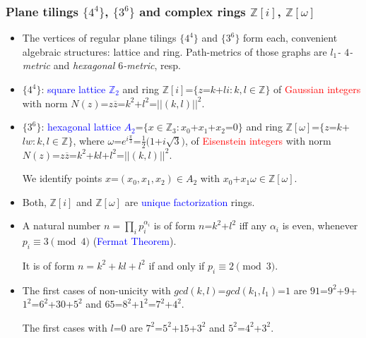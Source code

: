 \documentclass{beamer}
\newcommand{\ZZ}{\ensuremath{\mathbb{Z}}}
\begin{document}
\begin{frame}\frametitle{Plane tilings $\{4^4\}$, $\{3^6\}$ and 
 complex rings 
$\mathbb{Z}[i]$,
$\mathbb{Z}[\omega]$}
\vspace{-3mm}
\begin{itemize}
\item
The vertices of regular plane tilings $\{4^4\}$  and
$\{3^6\}$ form each,  convenient  algebraic structures: lattice and  ring.
Path-metrics of those graphs are {\em $l_1$- $4$-metric} and {\em 
hexagonal  
$6$-metric}, resp.
\item $\{4^4\}$:
\textcolor{blue}{square lattice $\mathbb{Z}_2$} and  ring
$\mathbb{Z}[i]$=$\{z$=$k$+$li: k,l \in \mathbb{Z}\}$ of
\textcolor{red}{Gaussian integers} with norm
$N(z)$=$z\overline{z}$=$k^2$+$l^2$=$||(k,l)||^2$.
\item $\{3^6\}$:  \textcolor{blue}{hexagonal lattice $A_2$}=$\{x\in 
\mathbb{Z}_3:
x_0$+$x_1$+$x_2$=$0\}$  and  ring
$\mathbb{Z}[\omega]$=$\{z$=$k$+$lw: k,l \in \mathbb{Z}\}$, where
$\omega$=$e^{i\frac{\pi}{3}}$=$\frac{1}{2}(1$+$i\sqrt{3})$,  of
\textcolor{red}{Eisenstein integers}
with norm   
$N(z)$=$z\overline{z}$=$k^2$+$kl$+$l^2$=$||(k,l)||^2$.

We identify  points $x$=$(x_0,x_1,x_2)\in A_2$ with 
$x_0$+$x_1\omega\in \mathbb{Z}[\omega]$.

\item Both,  $\ZZ[i]$
 and  $\ZZ[\omega]$ are \textcolor{blue}{unique factorization}
rings. 


\item A natural number  $n= \prod_{i}p_i^{\alpha_i}$ is of form
$n$=$k^2$+$l^2$ iff any $\alpha_i$ is even,
whenever $p_i \equiv 3\pmod4$ (\textcolor{blue}{Fermat Theorem}).

It is of form 
$n=k^2+kl+l^2$ if and only if 
$p_i\equiv 2\pmod 3$.

\item The first cases of non-unicity with 
$gcd(k,l)$=$gcd(k_1,l_1)$=$1$ are $91$=$9^2$+$9$+$1^2$=$6^2$+$30$+$5^2$  
and $65$=$8^2$+$1^2$=$7^2$+$4^2$. 

The first cases with $l$=$0$ are 
 $7^2$=$5^2$+$15$+$3^2$ and $5^2$=$4^2$+$3^2$.
\end{itemize}
\end{frame}
\end{document}
